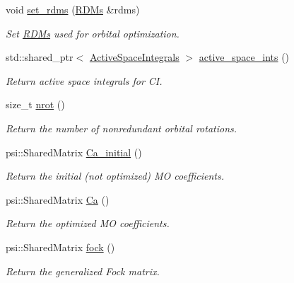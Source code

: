\begin{DoxyCompactItemize}
void \mbox{\hyperlink{classforte_1_1_c_a_s_s_c_f___o_r_b___g_r_a_d_a3cab4efed9ba2074faa0f839942643b6}{set\+\_\+rdms}} (\mbox{\hyperlink{classforte_1_1_r_d_ms}{R\+D\+Ms}} \&rdms)
\begin{DoxyCompactList}\small\item\em Set \mbox{\hyperlink{classforte_1_1_r_d_ms}{R\+D\+Ms}} used for orbital optimization. \end{DoxyCompactList}\item 
std\+::shared\+\_\+ptr$<$ \mbox{\hyperlink{classforte_1_1_active_space_integrals}{Active\+Space\+Integrals}} $>$ \mbox{\hyperlink{classforte_1_1_c_a_s_s_c_f___o_r_b___g_r_a_d_acdd6accf6713d21c0120fa11db860452}{active\+\_\+space\+\_\+ints}} ()
\begin{DoxyCompactList}\small\item\em Return active space integrals for CI. \end{DoxyCompactList}\item 
size\+\_\+t \mbox{\hyperlink{classforte_1_1_c_a_s_s_c_f___o_r_b___g_r_a_d_a481ef4e93b34e4bea58958b3272910d3}{nrot}} ()
\begin{DoxyCompactList}\small\item\em Return the number of nonredundant orbital rotations. \end{DoxyCompactList}\item 
psi\+::\+Shared\+Matrix \mbox{\hyperlink{classforte_1_1_c_a_s_s_c_f___o_r_b___g_r_a_d_a8de4e9ec4929e587f36cd93d002c5d71}{Ca\+\_\+initial}} ()
\begin{DoxyCompactList}\small\item\em Return the initial (not optimized) MO coefficients. \end{DoxyCompactList}\item 
psi\+::\+Shared\+Matrix \mbox{\hyperlink{classforte_1_1_c_a_s_s_c_f___o_r_b___g_r_a_d_a67df009b090569815681edd6aa24c922}{Ca}} ()
\begin{DoxyCompactList}\small\item\em Return the optimized MO coefficients. \end{DoxyCompactList}\item 
psi\+::\+Shared\+Matrix \mbox{\hyperlink{classforte_1_1_c_a_s_s_c_f___o_r_b___g_r_a_d_a62eb3d13f76a9a3398a0a443c33dc42c}{fock}} ()
\begin{DoxyCompactList}\small\item\em Return the generalized Fock matrix. \end{DoxyCompactList}\item 

\end{DoxyCompactItemize}
